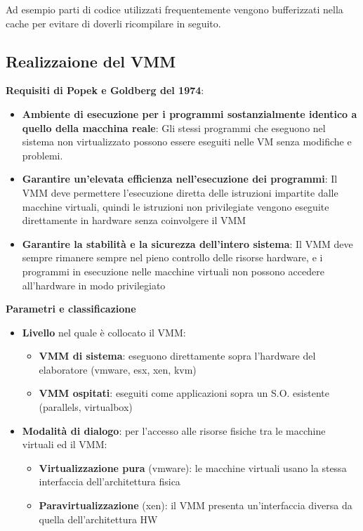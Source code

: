 \documentclass{article}
\begin{document}
Ad esempio parti di codice utilizzati frequentemente vengono bufferizzati nella cache per evitare di doverli ricompilare in seguito.


\subsection{Realizzaione del VMM}
\textbf{Requisiti di Popek e Goldberg del 1974}:

\begin{itemize}
    \item \textbf{Ambiente di esecuzione per i programmi sostanzialmente identico a quello della macchina reale}: Gli stessi programmi che eseguono nel sistema non virtualizzato possono essere eseguiti nelle VM
    senza modifiche e problemi.
    \item \textbf{Garantire un'elevata efficienza nell'esecuzione dei programmi}: Il VMM deve permettere l'esecuzione diretta delle istruzioni impartite dalle macchine virtuali, quindi le istruzioni non 
    privilegiate vengono eseguite direttamente in hardware senza coinvolgere il VMM
    \item \textbf{Garantire la stabilità e la sicurezza dell'intero sistema}: Il VMM deve sempre rimanere sempre nel pieno controllo delle risorse hardware, e i programmi in  esecuzione nelle macchine virtuali non possono 
    accedere all'hardware in modo privilegiato
\end{itemize}

\textbf{Parametri e classificazione}
\begin{itemize}
    \item \textbf{Livello} nel quale è collocato il VMM:
    \begin{itemize}
        \item \textbf{VMM di sistema}: eseguono direttamente sopra l'hardware del elaboratore (vmware, esx, xen, kvm)
        \item \textbf{VMM ospitati}: eseguiti come applicazioni sopra un S.O. esistente (parallels, virtualbox)
    \end{itemize}
    \item \textbf{Modalità di dialogo}: per l'accesso alle risorse fisiche tra le macchine virtuali ed il VMM:
    \begin{itemize}
        \item \textbf{Virtualizzazione pura} (vmware): le macchine virtuali usano la stessa interfaccia dell'architettura fisica
        \item \textbf{Paravirtualizzazione} (xen): il VMM presenta un'interfaccia diversa da quella dell'architettura HW
    \end{itemize}
\end{itemize}
\end{document}
